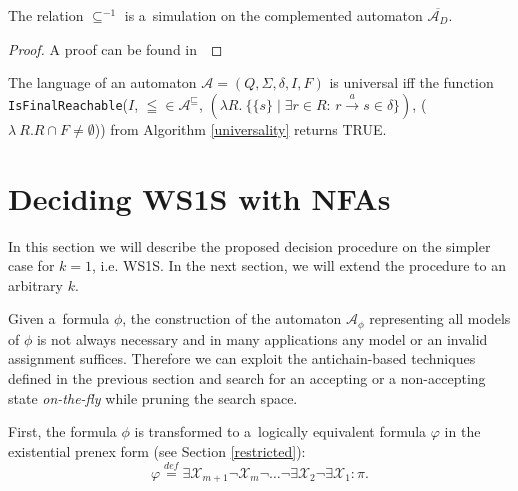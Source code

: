\begin{lemma}\label{simulation-in-ca}
The relation $\subseteq^{-1}$ is a~simulation on the complemented automaton
$\overline{\mathcal{A}_D}$.
\end{lemma}
\begin{proof}
 A proof can be found in~\cite{raskin}
\end{proof}

\begin{lemma}
The language of an automaton $\mathcal{A} = (Q, \Sigma, \delta, I, F)$ is
universal iff the function \texttt{IsFinalReachable}($I$, $\leqq \in \mathcal{A}^\sqsubseteq$,
 $(\lambda R.\ \{\{s\} \mid \exists r \in R:\, r \overset{a}{\longrightarrow} s
 \in \delta\})$, ($\lambda\ R.
 R \cap F \neq \emptyset$)) from
Algorithm \ref{universality} returns
\textsc{TRUE}.
\end{lemma}

\section{Deciding WS1S with NFAs}

In this section we will describe the proposed decision procedure on the simpler
case for $k = 1$, i.e. WS1S. In the next section, we will extend the procedure
to an arbitrary $k$.

Given a~formula $\phi$, the construction of the automaton $\mathcal{A}_\phi$
representing all models of $\phi$ is not always necessary and in many
applications any model or an invalid assignment suffices.
Therefore we can exploit the antichain-based techniques defined in the previous
section and search for an accepting or a non-accepting state \emph{on-the-fly}
while pruning the search space.

First, the formula $\phi$ is transformed to a~logically equivalent formula
$\varphi$ in the existential prenex form (see Section \ref{restricted}):
\begin{equation*}
 \varphi \overset{\mathit{def}}{=}
 \exists\mathcal{X}_{m+1}\neg\mathcal{X}_m\neg\ldots\neg\exists\mathcal{X}_2\neg\exists\mathcal{X}_1
 :
 \pi.
\end{equation*}


